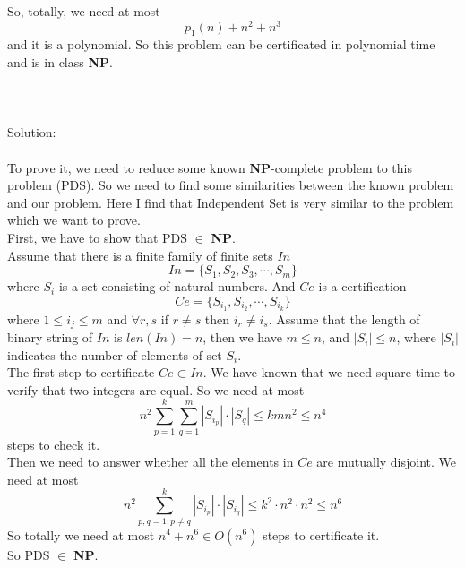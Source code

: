 \documentclass[a4papper]{article}
\theoremstyle{neosn}
\begin{document}
    So, totally, we need at most
    \[
        p_1(n) + n^2 + n^3
    \]
    and it is a polynomial.
    So this problem can be certificated in polynomial time and is in class \textbf{NP}. \\

    \\
    \\

     \\

    Solution: \\

    \\

    To prove it, we need to reduce some known \textbf{NP}-complete problem to this problem (PDS).
    So we need to find some similarities between the known problem and our problem.
    Here I find that Independent Set is very similar to the problem which we want to prove. \\

    First, we have to show that PDS $\in$ \textbf{NP}. \\
    Assume that there is a finite family of finite sets $In$
    \[
        In = \{S_1, S_2, S_3, \cdots, S_m\}
    \]
    where $S_i$ is a set consisting of natural numbers.
    And $Ce$ is a certification
    \[
        Ce = \{S_{i_1}, S_{i_2}, \cdots, S_{i_k}\}
    \]
    where $1 \leqslant i_j \leqslant m$ and $\forall r,s$ if $r \neq s$ then $i_r \neq i_s$.
    Assume that the length of binary string of $In$ is $len(In) = n$, then we have $m \leqslant n$,
    and $|S_i| \leqslant n$, where $|S_i|$ indicates the number of elements of set $S_i$. \\
    The first step to certificate $Ce \subset In$.
    We have known that we need square time to verify that two integers are equal.
    So we need at most
    \[
        n^2 \sum_{p=1}^k \sum_{q=1}^m |S_{i_p}| \cdot |S_q| \leqslant kmn^2 \leqslant n^4
    \]
    steps to check it. \\
    Then we need to answer whether all the elements in $Ce$ are mutually disjoint.
    We need at most
    \[
        n^2 \sum_{p,q=1;p \neq q}^k |S_{i_p}|\cdot |S_{i_q}| \leqslant k^2 \cdot n^2 \cdot n^2 \leqslant n^6
    \]
    So totally we need at most $n^4+n^6 \in O(n^6)$ steps to certificate it. \\
    So PDS $\in$ \textbf{NP}. \\
\end{document}
